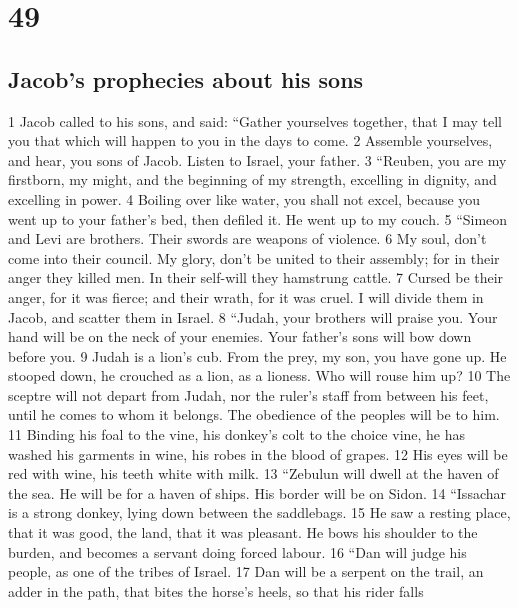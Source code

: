 \hypertarget{section-48}{%
\section{49}\label{section-48}}

\hypertarget{jacobs-prophecies-about-his-sons}{%
\subsection{Jacob's prophecies about his
sons}\label{jacobs-prophecies-about-his-sons}}

{1} Jacob called to his sons, and said: ``Gather yourselves together,
that I may tell you that which will happen to you in the days to come.
{2} Assemble yourselves, and hear, you sons of Jacob. Listen to Israel,
your father. {3} ``Reuben, you are my firstborn, my might, and the
beginning of my strength, excelling in dignity, and excelling in power.
{4} Boiling over like water, you shall not excel, because you went up to
your father's bed, then defiled it. He went up to my couch. {5} ``Simeon
and Levi are brothers. Their swords are weapons of violence. {6} My
soul, don't come into their council. My glory, don't be united to their
assembly; for in their anger they killed men. In their self-will they
hamstrung cattle. {7} Cursed be their anger, for it was fierce; and
their wrath, for it was cruel. I will divide them in Jacob, and scatter
them in Israel. {8} ``Judah, your brothers will praise you. Your hand
will be on the neck of your enemies. Your father's sons will bow down
before you. {9} Judah is a lion's cub. From the prey, my son, you have
gone up. He stooped down, he crouched as a lion, as a lioness. Who will
rouse him up? {10} The sceptre will not depart from Judah, nor the
ruler's staff from between his feet, until he comes to whom it belongs.
The obedience of the peoples will be to him. {11} Binding his foal to
the vine, his donkey's colt to the choice vine, he has washed his
garments in wine, his robes in the blood of grapes. {12} His eyes will
be red with wine, his teeth white with milk. {13} ``Zebulun will dwell
at the haven of the sea. He will be for a haven of ships. His border
will be on Sidon. {14} ``Issachar is a strong donkey, lying down between
the saddlebags. {15} He saw a resting place, that it was good, the land,
that it was pleasant. He bows his shoulder to the burden, and becomes a
servant doing forced labour. {16} ``Dan will judge his people, as one of
the tribes of Israel. {17} Dan will be a serpent on the trail, an adder
in the path, that bites the horse's heels, so that his rider falls
